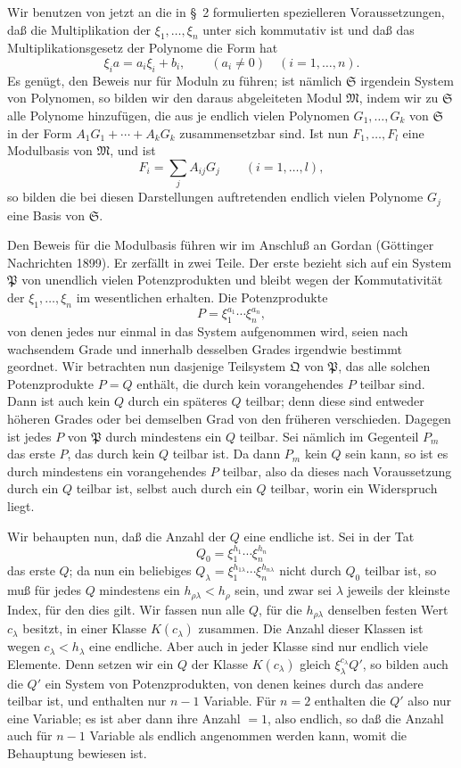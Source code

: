 \documentclass[11pt]{article}
\newcommand{\mM}{\mathfrak{M}}
\newcommand{\mP}{\mathfrak{P}}
\newcommand{\mQ}{\mathfrak{Q}}
\newcommand{\mS}{\mathfrak{S}}
\begin{document}
Wir benutzen von jetzt an die in \S~2 formulierten spezielleren Voraussetzungen, daß die Multiplikation der $\xi_1,\ldots,\xi_n$ unter sich kommutativ ist und daß das Multiplikationsgesetz der Polynome die Form hat
\begin{equation}
 \xi_i a=a_i\xi_i+b_i,
 \qquad (a_i\ne0)\quad(i=1,\ldots,n).
\tag{6}
\end{equation}
Es genügt, den Beweis nur für Moduln zu führen; ist nämlich $\mS$ irgendein System von Polynomen, so bilden wir den daraus abgeleiteten Modul $\mM$, indem wir zu $\mS$ alle Polynome hinzufügen, die aus je endlich vielen Polynomen $G_1,
\ldots,G_k$ von $\mS$ in der Form $A_1G_1+
\cdots+A_kG_k$ zusammensetzbar sind. Ist nun $F_1,\ldots,F_l$ eine Modulbasis von $\mM$, und ist
\[
 F_i=\sum_j A_{ij}G_j\qquad(i=1,\ldots,l),
\]
so bilden die bei diesen Darstellungen auftretenden endlich vielen Polynome $G_j$ eine Basis von $\mS$.

Den Beweis für die Modulbasis führen wir im Anschluß an Gordan (Göttinger Nachrichten 1899). Er zerfällt in zwei Teile. Der erste bezieht sich auf ein System $\mP$ von unendlich vielen Potenzprodukten und bleibt wegen der Kommutativität der $\xi_1,\ldots,\xi_n$ im wesentlichen erhalten. Die Potenzprodukte
\[
 P=\xi_1^{a_1}\cdots\xi_n^{a_n},
\]
von denen jedes nur einmal in das System aufgenommen wird, seien nach wachsendem Grade und innerhalb desselben Grades irgendwie bestimmt geordnet. Wir betrachten nun dasjenige Teilsystem $\mQ$ von $\mP$, das alle solchen Potenzprodukte $P=Q$ enthält, die durch kein vorangehendes $P$ teilbar sind. Dann ist auch kein $Q$ durch ein späteres $Q$ teilbar; denn diese sind entweder höheren Grades oder bei demselben Grad von den früheren verschieden. Dagegen ist jedes $P$ von $\mP$ durch mindestens ein $Q$ teilbar. Sei nämlich im Gegenteil $P_m$ das erste $P$, das durch kein $Q$ teilbar ist. Da dann $P_m$ kein $Q$ sein kann, so ist es durch mindestens ein vorangehendes $P$ teilbar, also da dieses nach Voraussetzung durch ein $Q$ teilbar ist, selbst auch durch ein $Q$ teilbar, worin ein Widerspruch liegt.

Wir behaupten nun, daß die Anzahl der $Q$ eine endliche ist. Sei in der Tat
\[
 Q_0=\xi_1^{h_1}\cdots\xi_n^{h_n}
\]
das erste $Q$; da nun ein beliebiges $Q_\lambda=\xi_1^{h_{1\lambda}}\cdots\xi_n^{h_{n\lambda}}$ nicht durch $Q_0$ teilbar ist, so muß für jedes $Q$ mindestens ein $h_{\rho\lambda}<h_\rho$ sein, und zwar sei $\lambda$ jeweils der kleinste Index, für den dies gilt. Wir fassen nun alle $Q$, für die $h_{\rho\lambda}$ denselben festen Wert $c_\lambda$ besitzt, in einer Klasse $K(c_\lambda)$ zusammen. Die Anzahl dieser Klassen ist wegen $c_\lambda<h_\lambda$ eine endliche. Aber auch in jeder Klasse sind nur endlich viele Elemente. Denn setzen wir ein $Q$ der Klasse $K(c_\lambda)$ gleich $\xi_\lambda^{c_\lambda}Q'$, so bilden auch die $Q'$ ein System von Potenzprodukten, von denen keines durch das andere teilbar ist, und enthalten nur $n-1$ Variable. Für $n=2$ enthalten die $Q'$ also nur eine Variable; es ist aber dann ihre Anzahl $=1$, also endlich, so daß die Anzahl auch für $n-1$ Variable als endlich angenommen werden kann, womit die Behauptung bewiesen ist.
\end{document}

